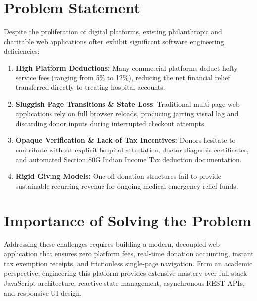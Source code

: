 \documentclass[12pt,a4paper,oneside]{report}
\begin{document}
\section{Problem Statement}
Despite the proliferation of digital platforms, existing philanthropic and charitable web applications often exhibit significant software engineering deficiencies:
\begin{enumerate}
    \item \textbf{High Platform Deductions:} Many commercial platforms deduct hefty service fees (ranging from 5\% to 12\%), reducing the net financial relief transferred directly to treating hospital accounts.
    \item \textbf{Sluggish Page Transitions \& State Loss:} Traditional multi-page web applications rely on full browser reloads, producing jarring visual lag and discarding donor inputs during interrupted checkout attempts.
    \item \textbf{Opaque Verification \& Lack of Tax Incentives:} Donors hesitate to contribute without explicit hospital attestation, doctor diagnosis certificates, and automated Section 80G Indian Income Tax deduction documentation.
    \item \textbf{Rigid Giving Models:} One-off donation structures fail to provide sustainable recurring revenue for ongoing medical emergency relief funds.
\end{enumerate}

\section{Importance of Solving the Problem}
Addressing these challenges requires building a modern, decoupled web application that ensures zero platform fees, real-time donation accounting, instant tax exemption receipts, and frictionless single-page navigation. From an academic perspective, engineering this platform provides extensive mastery over full-stack JavaScript architecture, reactive state management, asynchronous REST APIs, and responsive UI design.
\end{document}
